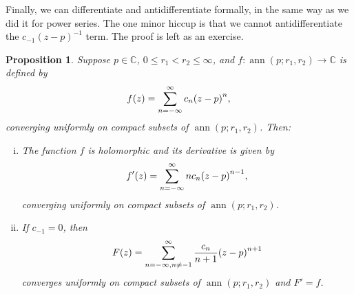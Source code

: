 \documentclass[12pt,openany]{book}
\newcommand{\avoidbreak}{\postdisplaypenalty=100}
\newcommand{\ann}{\operatorname{ann}}
\newcommand{\C}{{\mathbb{C}}}
\theoremstyle{plain}
\newtheorem{prop}[thm]{Proposition}
\theoremstyle{remark}
\theoremstyle{definition}
\theoremstyle{exercise}
\theoremstyle{example}
\begin{document}
\medskip

Finally, we can differentiate and antidifferentiate
formally, in the same way as we did it for power series.  The one minor
hiccup is that we cannot antidifferentiate the $c_{-1}{(z-p)}^{-1}$ term.
The proof is left as an exercise.

\begin{prop} \label{prop:diffantidifflaurent}
Suppose $p \in \C$, $0 \leq r_1 < r_2 \leq \infty$, and
$f \colon \ann(p;r_1,r_2) \to \C$ is defined by
\begin{equation*}
f(z) = \sum_{n=-\infty}^\infty c_n {(z-p)}^n ,
\avoidbreak
\end{equation*}
converging uniformly on compact subsets of $\ann(p;r_1,r_2)$.  Then:
\begin{enumerate}[(i)]
\item
The function
$f$ is holomorphic and its 
derivative is given by
\begin{equation*}
f'(z) = \sum_{n=-\infty}^\infty n c_n {(z-p)}^{n-1} ,
\avoidbreak
\end{equation*}
converging uniformly on compact subsets of $\ann(p;r_1,r_2)$.
\item
If $c_{-1} = 0$, then
\begin{equation*}
F(z) = \sum_{n=-\infty,n \neq -1}^\infty \frac{c_n}{n+1} {(z-p)}^{n+1}
\avoidbreak
\end{equation*}
converges uniformly on compact subsets of
$\ann(p;r_1,r_2)$ and $F' = f$.
\end{enumerate}
\end{prop}
\end{document}
